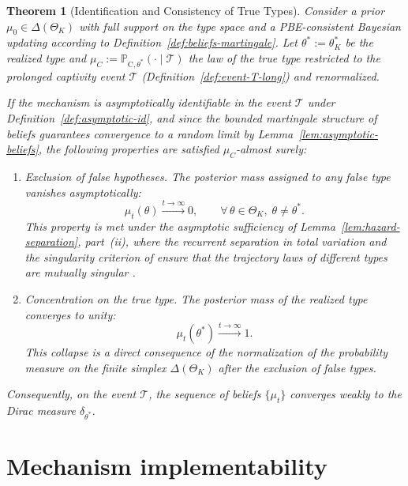 \documentclass[review,authoryear,12pt]{elsarticle}
\theoremstyle{plain}
\newtheorem{theorem}{Theorem}
\theoremstyle{definition}
\newcommand{\ProbC}[1]{\mathbb{P}_{\mathrm{C},#1}}
\newcommand{\ThetaK}{\Theta_K}
\newcommand{\1}{\mathbf{1}}
\begin{document}
\begin{theorem}[Identification and Consistency of True Types]\label{thm:posterior-consistency}
\normalfont
Consider a prior $\mu_0\in\Delta(\ThetaK)$ with full support on the type space and a PBE-consistent Bayesian updating according to Definition~\ref{def:beliefs-martingale}. Let $\theta^\ast:=\theta_K^\ast$ be the realized type and $\mu_C:=\ProbC{\theta^\ast}(\cdot\mid\mathcal{T})$ the law of the true type restricted to the prolonged captivity event $\mathcal{T}$ \textup{(}Definition~\ref{def:event-T-long}\textup{)} and renormalized.

If the mechanism is asymptotically identifiable in the event $\mathcal{T}$ under Definition~\ref{def:asymptotic-id}, and since the bounded martingale structure of beliefs guarantees convergence to a random limit by Lemma~\ref{lem:asymptotic-beliefs}, the following properties are satisfied $\mu_C$-almost surely:
\begin{enumerate}
  \item Exclusion of false hypotheses. The posterior mass assigned to any false type vanishes asymptotically:
  \begin{equation*}
  \mu_t(\theta)\xrightarrow{t\to\infty}0,\qquad \forall\,\theta\in\ThetaK,\;\theta\neq\theta^\ast.
  \end{equation*}
  This property is met under the asymptotic sufficiency of Lemma~\ref{lem:hazard-separation}, part~\textup{(ii)}, where the recurrent separation in total variation and the singularity criterion of \citet{Kakutani1948} ensure that the trajectory laws of different types are mutually singular \citet{Shiryaev2019Probability}.

  \item Concentration on the true type. The posterior mass of the realized type converges to unity:
  \begin{equation*}
  \mu_t(\theta^\ast)\xrightarrow{t\to\infty}1.
  \end{equation*}
  This collapse is a direct consequence of the normalization of the probability measure on the finite simplex $\Delta(\ThetaK)$ after the exclusion of false types.
\end{enumerate}
Consequently, on the event $\mathcal{T}$, the sequence of beliefs $\{\mu_t\}$ converges weakly to the Dirac measure $\delta_{\theta^\ast}$.
\end{theorem}



\section{Mechanism implementability}\label{sec:implementabilidad}
\end{document}
